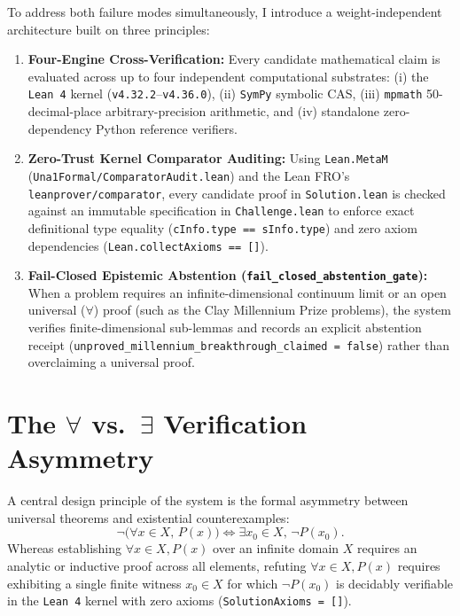 \documentclass[11pt,a4paper]{article}
\begin{document}
To address both failure modes simultaneously, I introduce a weight-independent architecture built on three principles:
\begin{enumerate}
    \item \textbf{Four-Engine Cross-Verification:} Every candidate mathematical claim is evaluated across up to four independent computational substrates: (i) the \texttt{Lean 4} kernel (\texttt{v4.32.2}--\texttt{v4.36.0}), (ii) \texttt{SymPy} symbolic CAS, (iii) \texttt{mpmath} 50-decimal-place arbitrary-precision arithmetic, and (iv) standalone zero-dependency Python reference verifiers.
    \item \textbf{Zero-Trust Kernel Comparator Auditing:} Using \texttt{Lean.MetaM} (\texttt{Una1Formal/ComparatorAudit.lean}) and the Lean FRO's \texttt{leanprover/comparator}, every candidate proof in \texttt{Solution.lean} is checked against an immutable specification in \texttt{Challenge.lean} to enforce exact definitional type equality (\texttt{cInfo.type == sInfo.type}) and zero axiom dependencies (\texttt{Lean.collectAxioms == []}).
    \item \textbf{Fail-Closed Epistemic Abstention (\texttt{fail\_closed\_abstention\_gate}):} When a problem requires an infinite-dimensional continuum limit or an open universal ($\forall$) proof (such as the Clay Millennium Prize problems), the system verifies finite-dimensional sub-lemmas and records an explicit abstention receipt (\texttt{unproved\_millennium\_breakthrough\_claimed = false}) rather than overclaiming a universal proof.
\end{enumerate}

\section{The $\forall$ vs.\ $\exists$ Verification Asymmetry}

A central design principle of the system is the formal asymmetry between universal theorems and existential counterexamples:
\begin{equation}
  \neg \bigl(\forall x \in X,\, P(x)\bigr) \iff \exists x_0 \in X,\, \neg P(x_0).
\end{equation}
Whereas establishing $\forall x \in X, P(x)$ over an infinite domain $X$ requires an analytic or inductive proof across all elements, refuting $\forall x \in X, P(x)$ requires exhibiting a single finite witness $x_0 \in X$ for which $\neg P(x_0)$ is decidably verifiable in the \texttt{Lean 4} kernel with zero axioms (\texttt{SolutionAxioms = []}).
\end{document}

